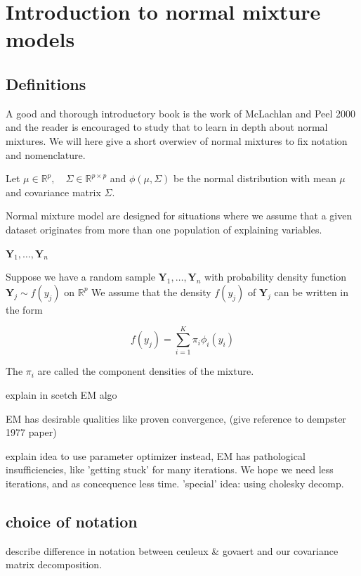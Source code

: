 \chapter{Introduction to normal mixture models}


\section{Definitions}

A good and thorough introductory book is the work of McLachlan and Peel 2000 and the reader is encouraged to study that to learn in depth about normal mixtures. We will here give a short overwiev of normal mixtures to fix notation and nomenclature.

Let $ \mu \in \mathbb{R}^p , \quad \Sigma \in \mathbb{R}^{p \times p} $ and $ \phi(\mu, \Sigma) $ be the normal distribution with mean $ \mu $ and covariance matrix $ \Sigma $.

Normal mixture model are designed for situations where we assume that a given dataset originates from more than one population of explaining variables.

$ \pmb{Y}_1, \dots , \pmb{Y}_n $

\begin{definition}
    Suppose we have a random sample $ \pmb{Y}_1, \dots , \pmb{Y}_n $ with probability density function $ \pmb{Y}_j \sim f(y_j) $ on $\mathbb{R}^p$ We assume that the density $ f(y_j) $ of $ \pmb{Y}_j $ can be written in the form 

    \[ f(y_j) = \sum_{i=1}^{K} \pi_i \phi_i (y_i) \]

    The $ \pi_i $ are called the component densities of the mixture.
\end{definition}

explain in scetch EM algo

EM has desirable qualities like proven convergence, (give reference to dempster 1977 paper)

explain idea to use parameter optimizer instead, EM has pathological insufficiencies, like 'getting stuck' for many iterations. We hope we need less iterations, and as concequence less time. 'special' idea: using cholesky decomp.


\section{choice of notation}

describe difference in notation between ceuleux \& govaert and our covariance matrix decomposition.

